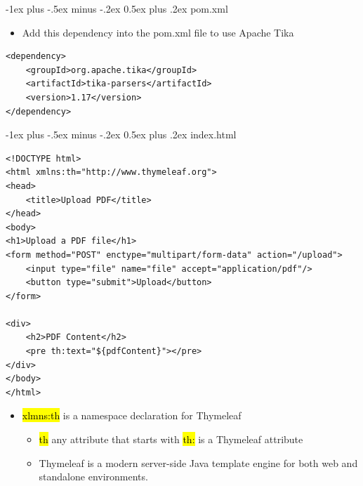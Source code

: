 \documentclass[10pt, landscape]{article}
\makeatletter
\renewcommand{\section}{\@startsection{section}{1}{0mm}%
  {-1ex plus -.5ex minus -.2ex}%
  {0.5ex plus .2ex}%
{\normalfont\large\bfseries}}
\makeatother
\begin{document}
\raggedright
\footnotesize
\begin{multicols*}{2}
    \setlength{\columnseprule}{0.25pt}

    \begin{center}
    \end{center}

    \section{pom.xml}
    \begin{itemize}
        \item Add this dependency into the pom.xml file to use Apache Tika
    \end{itemize}
    \begin{verbatim}
<dependency>
    <groupId>org.apache.tika</groupId>
    <artifactId>tika-parsers</artifactId>
    <version>1.17</version>
</dependency>
    \end{verbatim}

    \section{index.html}
    \begin{verbatim}
<!DOCTYPE html>
<html xmlns:th="http://www.thymeleaf.org">
<head>
    <title>Upload PDF</title>
</head>
<body>
<h1>Upload a PDF file</h1>
<form method="POST" enctype="multipart/form-data" action="/upload">
    <input type="file" name="file" accept="application/pdf"/>
    <button type="submit">Upload</button>
</form>

<div>
    <h2>PDF Content</h2>
    <pre th:text="${pdfContent}"></pre>
</div>
</body>
</html>

\end{verbatim}

    \begin{itemize}
        \item \hl{xlmns:th} is a namespace declaration for Thymeleaf
              \begin{itemize}
                  \item \hl{th} any attribute that starts with \hl{th:} is a Thymeleaf attribute
                  \item Thymeleaf is a modern server-side Java template engine for both web and standalone environments.
              \end{itemize}
    \end{itemize}



\end{multicols*}
\end{document}
